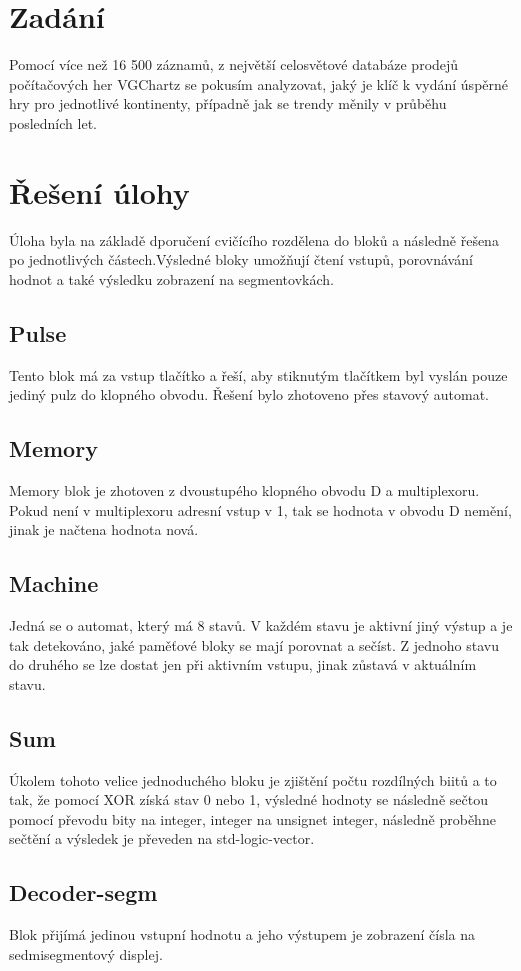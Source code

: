 \documentclass[FM,ZP]{tulthesis}
\begin{document}
\renewcommand{\baselinestretch}{1.50}
\setlength\parindent{1.2cm}
\selectfont
	
\begingroup
\renewcommand{\cleardoublepage}{}
\renewcommand{\clearpage}{}
\chapter{Zadání}
\endgroup
Pomocí více než 16 500 záznamů, z největší celosvětové databáze prodejů počítačových her VGChartz se pokusím analyzovat, jaký je klíč k vydání úspěrné hry pro jednotlivé kontinenty, případně jak se trendy měnily v průběhu posledních let.
	
\begingroup
\renewcommand{\cleardoublepage}{}
\renewcommand{\clearpage}{}
\newpage
\chapter{Řešení úlohy}
\endgroup
Úloha byla na základě dporučení cvičícího rozdělena do bloků a následně řešena po jednotlivých částech.Výsledné bloky umožňují čtení vstupů, porovnávání hodnot a také výsledku zobrazení na segmentovkách.

\section{Pulse}
Tento blok má za vstup tlačítko a řeší, aby stiknutým tlačítkem byl vyslán pouze jediný pulz do klopného obvodu. Řešení bylo zhotoveno přes stavový automat.

\section{Memory}
Memory blok je zhotoven z dvoustupého klopného obvodu D a multiplexoru. Pokud není v multiplexoru adresní vstup v 1, tak se hodnota v obvodu D nemění, jinak je načtena hodnota nová.

\section{Machine}
Jedná se o automat, který má 8 stavů. V každém stavu je aktivní jiný výstup a je tak detekováno, jaké paměťové bloky se mají porovnat a sečíst. Z jednoho stavu do druhého se lze dostat jen při aktivním vstupu, jinak zůstavá v aktuálním stavu.

\section{Sum}
Úkolem tohoto velice jednoduchého bloku je zjištění počtu rozdílných biitů a to tak, že pomocí XOR získá stav 0 nebo 1, výsledné hodnoty se následně sečtou pomocí převodu bity na integer, integer na unsignet integer, následně proběhne sečtění a výsledek je převeden na std-logic-vector.
	
\section{Decoder-segm}
Blok přijímá jedinou vstupní hodnotu a jeho výstupem je zobrazení čísla na sedmisegmentový displej.
\end{document}
